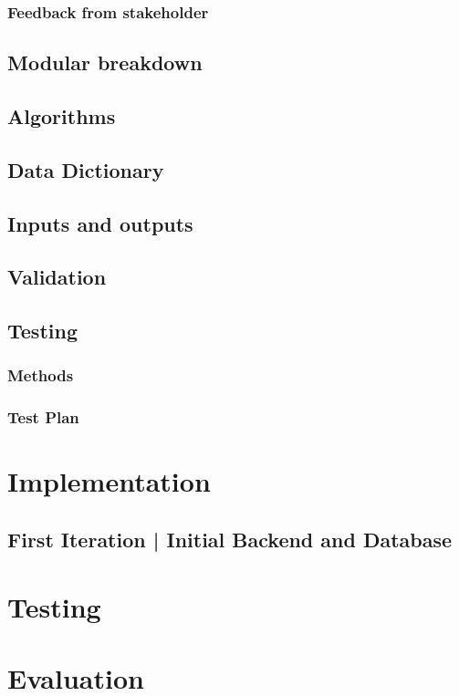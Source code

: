 \documentclass[11pt,a4paper]{article}
\begin{document}
\subsubsection{Feedback from stakeholder}

\subsection{Modular breakdown}

\subsection{Algorithms}

\subsection{Data Dictionary}

\subsection{Inputs and outputs}

\subsection{Validation}

\subsection{Testing}

\subsubsection{Methods}

\subsubsection{Test Plan}

\pagebreak

\section{Implementation}

\subsection{First Iteration | Initial Backend and Database}



\pagebreak

\section{Testing}

\section{Evaluation}
\end{document}
